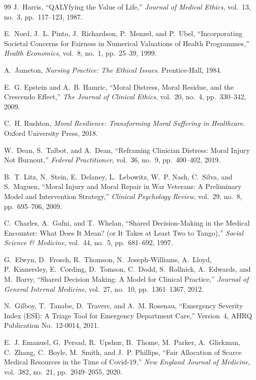 \documentclass[12pt]{article}
\theoremstyle{definition}
\theoremstyle{remark}
\begin{document}
\begin{thebibliography}{99}
J.~Harris, ``QALYfying the Value of Life,'' \emph{Journal of Medical Ethics}, vol.~13, no.~3, pp.~117--123, 1987.

E.~Nord, J.~L. Pinto, J.~Richardson, P.~Menzel, and P.~Ubel, ``Incorporating Societal Concerns for Fairness in Numerical Valuations of Health Programmes,'' \emph{Health Economics}, vol.~8, no.~1, pp.~25--39, 1999.

A.~Jameton, \emph{Nursing Practice: The Ethical Issues}.  Prentice-Hall, 1984.

E.~G. Epstein and A.~B. Hamric, ``Moral Distress, Moral Residue, and the Crescendo Effect,'' \emph{The Journal of Clinical Ethics}, vol.~20, no.~4, pp.~330--342, 2009.

C.~H. Rushton, \emph{Moral Resilience: Transforming Moral Suffering in Healthcare}.  Oxford University Press, 2018.

W.~Dean, S.~Talbot, and A.~Dean, ``Reframing Clinician Distress: Moral Injury Not Burnout,'' \emph{Federal Practitioner}, vol.~36, no.~9, pp.~400--402, 2019.

B.~T. Litz, N.~Stein, E.~Delaney, L.~Lebowitz, W.~P. Nash, C.~Silva, and S.~Maguen, ``Moral Injury and Moral Repair in War Veterans: A Preliminary Model and Intervention Strategy,'' \emph{Clinical Psychology Review}, vol.~29, no.~8, pp.~695--706, 2009.

C.~Charles, A.~Gafni, and T.~Whelan, ``Shared Decision-Making in the Medical Encounter: What Does It Mean? (or It Takes at Least Two to Tango),'' \emph{Social Science \& Medicine}, vol.~44, no.~5, pp.~681--692, 1997.

G.~Elwyn, D.~Frosch, R.~Thomson, N.~Joseph-Williams, A.~Lloyd, P.~Kinnersley, E.~Cording, D.~Tomson, C.~Dodd, S.~Rollnick, A.~Edwards, and M.~Barry, ``Shared Decision Making: A Model for Clinical Practice,'' \emph{Journal of General Internal Medicine}, vol.~27, no.~10, pp.~1361--1367, 2012.

N.~Gilboy, T.~Tanabe, D.~Travers, and A.~M. Rosenau, ``Emergency Severity Index (ESI): A Triage Tool for Emergency Department Care,'' Version~4, AHRQ Publication No.\ 12-0014, 2011.

E.~J. Emanuel, G.~Persad, R.~Upshur, B.~Thome, M.~Parker, A.~Glickman, C.~Zhang, C.~Boyle, M.~Smith, and J.~P. Phillips, ``Fair Allocation of Scarce Medical Resources in the Time of Covid-19,'' \emph{New England Journal of Medicine}, vol.~382, no.~21, pp.~2049--2055, 2020.


\end{thebibliography}
\end{document}
